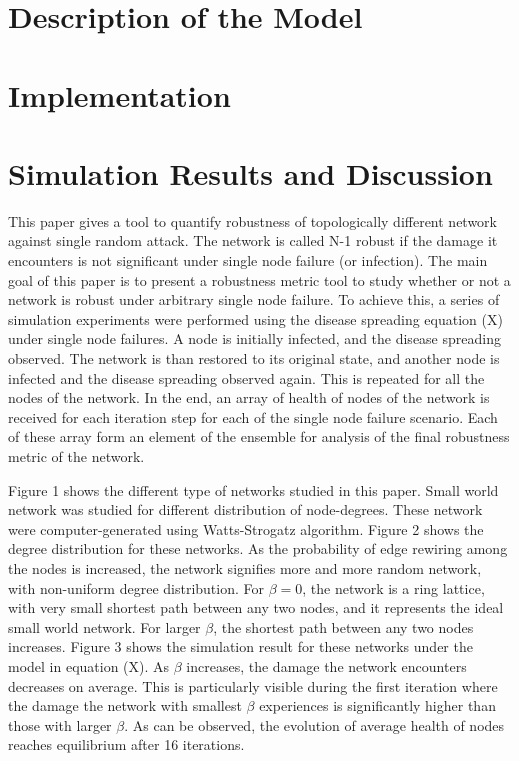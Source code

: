 \documentclass[11pt]{article}
\begin{document}
\section{Description of the Model}

\section{Implementation}

\newpage
\section{Simulation Results and Discussion}
This paper gives a tool to quantify robustness of topologically different network against single random attack. The network is called N-1 robust if the damage it encounters is not significant under single node failure (or infection). The main goal of this paper is to present a robustness metric tool to study whether or not a network is robust under arbitrary single node failure. To achieve this, a series of simulation experiments were performed using the disease spreading equation (X) under single node failures. A node is initially infected, and the disease spreading observed. The network is than restored to its original state, and another node is infected and the disease spreading observed again. This is repeated for all the nodes of the network. In the end, an array of health of nodes of the network is received for each iteration step for each of the single node failure scenario. Each of these array form an element of the ensemble for analysis of the final robustness metric of the network. 

Figure 1 shows the different type of networks studied in this paper. Small world network was studied for different distribution of node-degrees. These network were computer-generated using Watts-Strogatz algorithm. Figure 2 shows the degree distribution for these networks. As the probability of edge rewiring among the nodes is increased, the network signifies more and more random network, with non-uniform degree distribution. For $\beta=0$, the network is a ring lattice, with very small shortest path between any two nodes, and it represents the ideal small world network. For larger $\beta$, the shortest path between any two nodes increases. Figure 3 shows the simulation result for these networks under the model in equation (X). As $\beta$ increases, the damage the network encounters decreases on average. This is particularly visible during the first iteration where the damage the network with smallest $\beta$ experiences is significantly higher than those with larger $\beta$. As can be observed, the evolution of average health of nodes reaches equilibrium after 16 iterations. 
\end{document}

